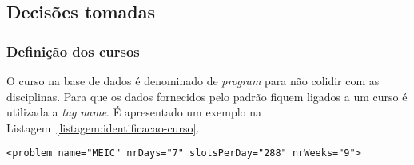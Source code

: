 \subsection{Decisões tomadas}

\subsubsection{Definição dos cursos}

O curso na base de dados é denominado de \textit{program} para não colidir com as disciplinas. Para que os dados fornecidos pelo padrão fiquem ligados a um curso é utilizada a \textit{tag} \textit{name}. É apresentado um exemplo na Listagem~\ref{listagem:identificacao-curso}.

\begin{minipage}[c]{\linewidth}
\begin{lstlisting}[caption={Exemplo da identificação do curso.}, label={listagem:identificacao-curso}]
<problem name="MEIC" nrDays="7" slotsPerDay="288" nrWeeks="9">
\end{lstlisting}
\end{minipage}









